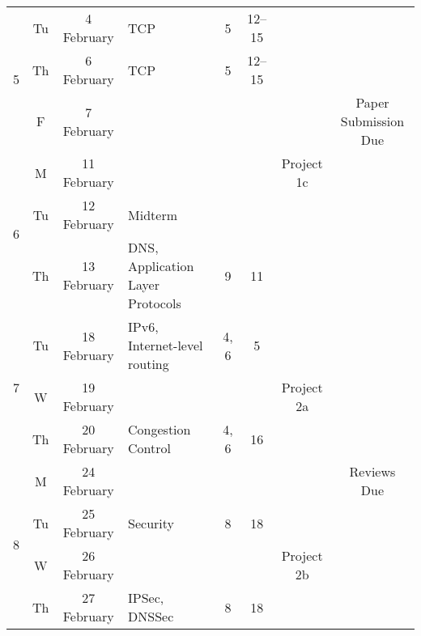 \documentclass[11pt]{article}
\begin{document}
\begin{sidewaystable}
\begin{tabular}{|c|cc||p{6cm}|c|c|c|c|}
\multirow{3}{*}{5}  
                    & Tu & 4 February   & TCP                                             & 5    & 12--15  & \cellcolor[gray]{0.9}  & \cellcolor[gray]{0.9} \\\cline{2-6}
                    & Th & 6 February   & TCP                                             & 5    & 12--15  & \cellcolor[gray]{0.9}  & \cellcolor[gray]{0.9} \\\cline{2-6}
                    & F  & 7 February   & \cellcolor[gray]{0.9} & \cellcolor[gray]{0.9} & \cellcolor[gray]{0.9} &  \cellcolor[gray]{0.9} & Paper Submission Due\\\hline\hline

\multirow{3}{*}{6}  & M  & 11 February  & \cellcolor[gray]{0.9} & \cellcolor[gray]{0.9} & \cellcolor[gray]{0.9} &  Project 1c & \cellcolor[gray]{0.9} \\\cline{2-6}
                    & Tu & 12 February  & Midterm & \cellcolor[gray]{0.9} & \cellcolor[gray]{0.9}  & \cellcolor[gray]{0.9}  & \cellcolor[gray]{0.9} \\\cline{2-6}
                    & Th & 13 February  & DNS, Application Layer Protocols                & 9    & 11      & \cellcolor[gray]{0.9}  & \cellcolor[gray]{0.9} \\\hline\hline

\multirow{3}{*}{7}  & Tu & 18 February  & IPv6, Internet-level routing                    & 4, 6 & 5       & \cellcolor[gray]{0.9} & \cellcolor[gray]{0.9} \\\cline{2-6}
                    & W  & 19 February  & \cellcolor[gray]{0.9} & \cellcolor[gray]{0.9} & \cellcolor[gray]{0.9} & Project 2a & \cellcolor[gray]{0.9} \\\cline{2-6}
                    & Th & 20 February  & Congestion Control                              & 4, 6 & 16      & \cellcolor[gray]{0.9}  & \cellcolor[gray]{0.9} \\\hline\hline

\multirow{4}{*}{8}  & M  & 24 February  & \cellcolor[gray]{0.9} & \cellcolor[gray]{0.9} & \cellcolor[gray]{0.9} &  \cellcolor[gray]{0.9} & Reviews Due \\\cline{2-7}
                    & Tu & 25 February  & Security                                        & 8    & 18      & \cellcolor[gray]{0.9}  & \cellcolor[gray]{0.9} \\\cline{2-6}
                    & W  & 26 February  & \cellcolor[gray]{0.9} & \cellcolor[gray]{0.9} & \cellcolor[gray]{0.9} & Project 2b & \cellcolor[gray]{0.9} \\\cline{2-6}
                    & Th & 27 February  & IPSec, DNSSec                                   & 8    & 18      & \cellcolor[gray]{0.9}  & \cellcolor[gray]{0.9} \\\hline\hline


\end{tabular}
\end{sidewaystable}
\end{document}
